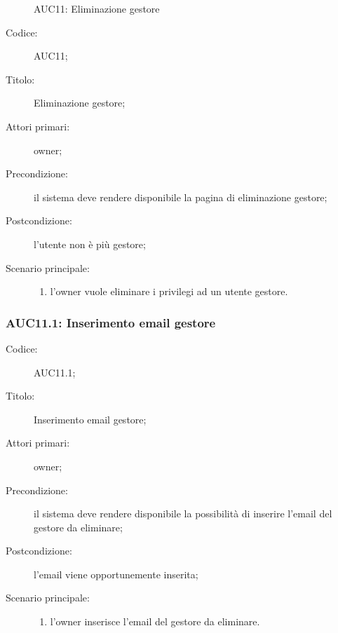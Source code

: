 \documentclass[../../../analisi-dei-requisiti.tex]{subfiles}
\begin{document}
\begin{figure}[H]
  \centering
  \caption{AUC11: Eliminazione gestore}%
  \label{fig:AUC11}
\end{figure}

\begin{description}
  \item[Codice:] AUC11;
  \item[Titolo:] Eliminazione gestore;
  \item[Attori primari:] owner;
  \item[Precondizione:] il sistema deve rendere disponibile la pagina di eliminazione gestore;
  \item[Postcondizione:] l'utente non è più gestore;
  \item[Scenario principale:]
  \begin{enumerate}
    \item l'owner vuole eliminare i privilegi ad un utente gestore.
  \end{enumerate}
\end{description}

\subsubsection{AUC11.1: Inserimento email gestore}%
\label{subs:AUC11.1}
\begin{description}
  \item[Codice:] AUC11.1;
  \item[Titolo:] Inserimento email gestore;
  \item[Attori primari:] owner;
  \item[Precondizione:] il sistema deve rendere disponibile la possibilità di inserire l'email del gestore da eliminare;
  \item[Postcondizione:] l'email viene opportunemente inserita;
  \item[Scenario principale:]
  \begin{enumerate}
    \item l'owner inserisce l'email del gestore da eliminare.
  \end{enumerate}
\end{description}
\end{document}
